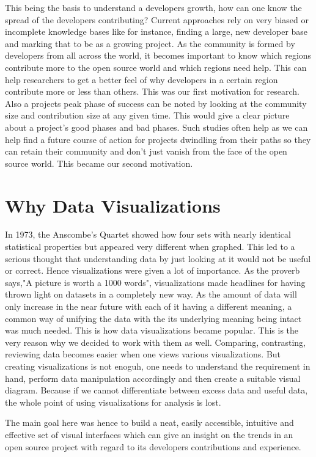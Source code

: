 \documentclass[seploa]{beavtex}
\begin{document}
This being the basis to understand a developers growth, how can one know the spread of the developers contributing? Current approaches rely on very biased or incomplete knowledge bases like for instance, finding a large, new developer base and marking that to be as a growing project\cite{igor2014}. As the community is formed by developers from all across the world, it becomes important to know which regions contribute more to the open source world and which regions need help. This can help researchers to get a better feel of why developers in a certain region contribute more or less than others. This was our first motivation for research. Also a projects peak phase of success can be noted by looking at the community size and contribution size at any given time. This would give a clear picture about a project's good phases and bad phases. Such studies often help as we can help find a future course of action for projects dwindling from their paths so they can retain their community and don't just vanish from the face of the open source world. This became our second motivation.

\section{Why Data Visualizations}
In 1973, the Anscombe's Quartet showed how four sets with nearly identical statistical properties but appeared very different when graphed\cite{wiki}. This led to a serious thought that understanding data by just looking at it would not be useful or correct. Hence visualizations were given a lot of importance. As the proverb says,"A picture is worth a 1000 words", visualizations made headlines for having thrown light on datasets in a completely new way. As the amount of data will only increase in the near future with each of it having a different meaning, a common way of unifying the data with the its underlying meaning being intact was much needed. This is how data visualizations became popular. This is the very reason why we decided to work with them as well. Comparing, contrasting, reviewing data becomes easier when one views various visualizations. But creating visualizations is not enoguh, one needs to understand the requirement in hand, perform data manipulation accordingly and then create a suitable visual diagram. Because if we cannot differentiate between excess data and useful data, the whole point of using visualizations for analysis is lost. 

The main goal here was hence to build a neat, easily accessible, intuitive and effective set of visual interfaces which can give an insight on the trends in an open source project with regard to its developers contributions and experience.
\end{document}
